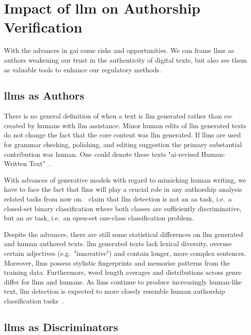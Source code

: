 \section{Impact of \acs{llm} on Authorship Verification}
\label{sec:llm_impact}

With the advances in \ac{gai} come risks and opportunities.
We can frame \acp{llm} as authors weakening our trust in the authenticity of digital texts, but also see them as valuable tools to enhance our regulatory methods.

\subsection{\acsp{llm} as Authors}
There is no general definition of when a text is \ac{llm} generated rather than co-created by humans with \ac{llm} assistance.
Minor human edits of \ac{llm} generated texts do not change the fact that the core content was \ac{llm} generated.
If \acp{llm} are used for grammar checking, polishing, and editing suggestion the primary substantial contribution was human.
One could denote these texts "\acs{ai}-revised Human-Written Text"~\citep{revised_2024}.

With advances of generative models with regard to mimicking human writing, we have to face the fact that \acp{llm} will play a crucial role in any authorship analysis related tasks from now on.
\citet{llm_detection_av_2025}\ claim that \ac{llm} detection is not an \ac{aa} task, i.e.\ a closed-set binary classification where both classes are sufficiently discriminative, but an \ac{av} task, i.e.\ an open-set one-class classification problem. 

Despite the advances, there are still some statistical differences on \ac{llm} generated and human authored texts.
\ac{llm} generated texts lack lexical diversity, overuse certain adjectives (e.g.\ "innovative") and contain longer, more complex sentences.
Moreover, \acp{llm} possess stylistic fingerprints and memorise patterns from the training data.
Furthermore, word length averages and distributions across genre differ for \acp{llm} and humans.
As \acp{llm} continue to produce increasingly human-like text, \ac{llm} detection is expected to more closely resemble human authorship classification tasks~\citep{llm_detection_av_2025}.


\subsection{\acsp{llm} as Discriminators}
\label{sec:llm_discriminator}

